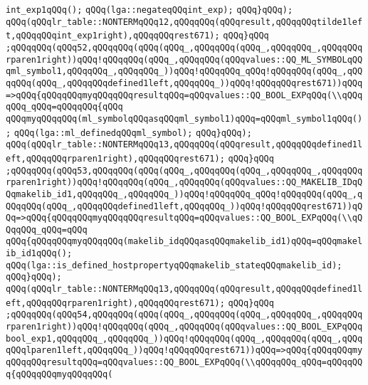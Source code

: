 \verb|int_exp1qQQq();|\newline
\verb|qQQq(lga::negateqQQqint_exp);|\newline
\verb|qQQq}qQQq);|\newline
\verb|qQQq(qQQqlr_table::NONTERMqQQq12,qQQqqQQq(qQQqresult,qQQqqQQqtilde1left,qQQqqQQqint_exp1right),qQQqqQQqrest671);|\newline
\verb|qQQq}qQQq|\newline
\verb|;qQQqqQQq(qQQq52,qQQqqQQq(qQQq(qQQq_,qQQqqQQq(qQQq_,qQQqqQQq_,qQQqqQQqrparen1right))qQQq!qQQqqQQq(qQQq_,qQQqqQQq(qQQqvalues::QQ_ML_SYMBOLqQQqml_symbol1,qQQqqQQq_,qQQqqQQq_))qQQq!qQQqqQQq_qQQq!qQQqqQQq(qQQq_,qQQqqQQq(qQQq_,qQQqqQQqdefined1left,qQQqqQQq_))qQQq!qQQqqQQqrest671))qQQq=>qQQq{qQQqqQQqmyqQQqqQQqresultqQQq=qQQqvalues::QQ_BOOL_EXPqQQq(\\qQQqqQQq_qQQq=qQQqqQQq{qQQq|\newline
\verb|qQQqmyqQQqqQQq(ml_symbolqQQqasqQQqml_symbol1)qQQq=qQQqml_symbol1qQQq();|\newline
\verb|qQQq(lga::ml_definedqQQqml_symbol);|\newline
\verb|qQQq}qQQq);|\newline
\verb|qQQq(qQQqlr_table::NONTERMqQQq13,qQQqqQQq(qQQqresult,qQQqqQQqdefined1left,qQQqqQQqrparen1right),qQQqqQQqrest671);|\newline
\verb|qQQq}qQQq|\newline
\verb|;qQQqqQQq(qQQq53,qQQqqQQq(qQQq(qQQq_,qQQqqQQq(qQQq_,qQQqqQQq_,qQQqqQQqrparen1right))qQQq!qQQqqQQq(qQQq_,qQQqqQQq(qQQqvalues::QQ_MAKELIB_IDqQQqmakelib_id1,qQQqqQQq_,qQQqqQQq_))qQQq!qQQqqQQq_qQQq!qQQqqQQq(qQQq_,qQQqqQQq(qQQq_,qQQqqQQqdefined1left,qQQqqQQq_))qQQq!qQQqqQQqrest671))qQQq=>qQQq{qQQqqQQqmyqQQqqQQqresultqQQq=qQQqvalues::QQ_BOOL_EXPqQQq(\\qQQqqQQq_qQQq=qQQq|\newline
\verb|qQQq{qQQqqQQqmyqQQqqQQq(makelib_idqQQqasqQQqmakelib_id1)qQQq=qQQqmakelib_id1qQQq();|\newline
\verb|qQQq(lga::is_defined_hostpropertyqQQqmakelib_stateqQQqmakelib_id);|\newline
\verb|qQQq}qQQq);|\newline
\verb|qQQq(qQQqlr_table::NONTERMqQQq13,qQQqqQQq(qQQqresult,qQQqqQQqdefined1left,qQQqqQQqrparen1right),qQQqqQQqrest671);|\newline
\verb|qQQq}qQQq|\newline
\verb|;qQQqqQQq(qQQq54,qQQqqQQq(qQQq(qQQq_,qQQqqQQq(qQQq_,qQQqqQQq_,qQQqqQQqrparen1right))qQQq!qQQqqQQq(qQQq_,qQQqqQQq(qQQqvalues::QQ_BOOL_EXPqQQqbool_exp1,qQQqqQQq_,qQQqqQQq_))qQQq!qQQqqQQq(qQQq_,qQQqqQQq(qQQq_,qQQqqQQqlparen1left,qQQqqQQq_))qQQq!qQQqqQQqrest671))qQQq=>qQQq{qQQqqQQqmyqQQqqQQqresultqQQq=qQQqvalues::QQ_BOOL_EXPqQQq(\\qQQqqQQq_qQQq=qQQqqQQq{qQQqqQQqmyqQQqqQQq(|\newline
